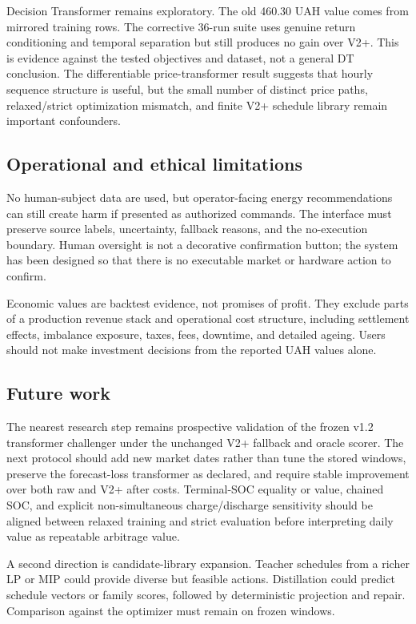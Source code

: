 Decision Transformer remains exploratory. The old 460.30 UAH value comes from mirrored training rows. The corrective 36-run suite uses genuine return conditioning and temporal separation but still produces no gain over V2+. This is evidence against the tested objectives and dataset, not a general DT conclusion. The differentiable price-transformer result suggests that hourly sequence structure is useful, but the small number of distinct price paths, relaxed/strict optimization mismatch, and finite V2+ schedule library remain important confounders.

\subsection{Operational and ethical limitations}

No human-subject data are used, but operator-facing energy recommendations can still create harm if presented as authorized commands. The interface must preserve source labels, uncertainty, fallback reasons, and the no-execution boundary. Human oversight is not a decorative confirmation button; the system has been designed so that there is no executable market or hardware action to confirm.

Economic values are backtest evidence, not promises of profit. They exclude parts of a production revenue stack and operational cost structure, including settlement effects, imbalance exposure, taxes, fees, downtime, and detailed ageing. Users should not make investment decisions from the reported UAH values alone.

\subsection{Future work}

The nearest research step remains prospective validation of the frozen v1.2 transformer challenger under the unchanged V2+ fallback and oracle scorer. The next protocol should add new market dates rather than tune the stored windows, preserve the forecast-loss transformer as declared, and require stable improvement over both raw and V2+ after costs. Terminal-SOC equality or value, chained SOC, and explicit non-simultaneous charge/discharge sensitivity should be aligned between relaxed training and strict evaluation before interpreting daily value as repeatable arbitrage value.

A second direction is candidate-library expansion. Teacher schedules from a richer LP or MIP could provide diverse but feasible actions. Distillation could predict schedule vectors or family scores, followed by deterministic projection and repair. Comparison against the optimizer must remain on frozen windows.

